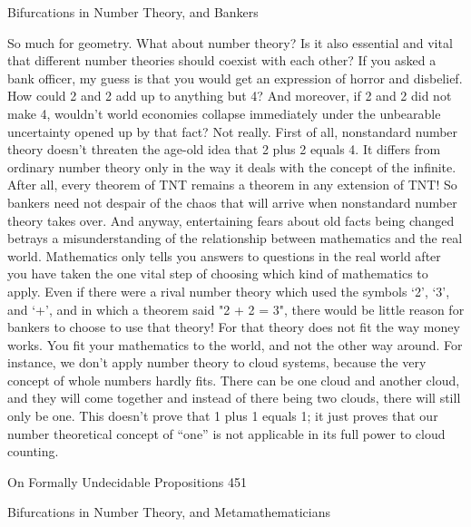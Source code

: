                      Bifurcations in Number Theory, and Bankers

So much for geometry. What about number theory? Is it also essential and vital that
different number theories should coexist with each other? If you asked a bank officer, my
guess is that you would get an expression of horror and disbelief. How could 2 and 2 add
up to anything but 4? And moreover, if 2 and 2 did not make 4, wouldn't world
economies collapse immediately under the unbearable uncertainty opened up by that
fact? Not really. First of all, nonstandard number theory doesn't threaten the age-old idea
that 2 plus 2 equals 4. It differs from ordinary number theory only in the way it deals with
the concept of the infinite. After all, every theorem of TNT remains a theorem in any
extension of TNT! So bankers need not despair of the chaos that will arrive when
nonstandard number theory takes over.
        And anyway, entertaining fears about old facts being changed betrays a
misunderstanding of the relationship between mathematics and the real world.
Mathematics only tells you answers to questions in the real world after you have taken
the one vital step of choosing which kind of mathematics to apply. Even if there were a
rival number theory which used the symbols `2', `3', and `+', and in which a theorem said
"2 + 2 = 3", there would be little reason for bankers to choose to use that theory! For that
theory does not fit the way money works. You fit your mathematics to the world, and not
the other way around. For instance, we don't apply number theory to cloud systems,
because the very concept of whole numbers hardly fits. There can be one cloud and
another cloud, and they will come together and instead of there being two clouds, there
will still only be one. This doesn't prove that 1 plus 1 equals 1; it just proves that our
number theoretical concept of “one” is not applicable in its full power to cloud counting.




On Formally Undecidable Propositions                                                     451

              Bifurcations in Number Theory, and Metamathematicians

